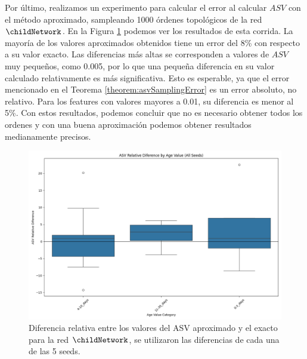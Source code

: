 Por último, realizamos un experimento para calcular el error al calcular $ASV$ con el método aproximado, sampleando 1000 órdenes topológicos de la red $\childNetwork$. En la Figura \ref{fig:boxplotASVApproximateDifferences} podemos ver los resultados de esta corrida. La mayoría de los valores aproximados obtenidos tiene un error del 8\% con respecto a su valor exacto. Las diferencias más altas se corresponden a valores de $ASV$ muy pequeños, como 0.005, por lo que una pequeña diferencia en su valor calculado relativamente es más significativa. Esto es esperable, ya que el error mencionado en el Teorema \ref{theorem:asvSamplingError} es un error absoluto, no relativo. Para los features con valores mayores a 0.01, su diferencia es menor al 5\%.
Con estos resultados, podemos concluir que no es necesario obtener todos los ordenes y con una buena aproximación podemos obtener resultados medianamente precisos. 


\begin{figure}
    \centering
    \includegraphics[width=0.8\linewidth]{img/asvResults/ChildAllSeedsASVBoxplot.png}
    \caption{Diferencia relativa entre los valores del ASV aproximado y el exacto para la red $\childNetwork$, se utilizaron las diferencias de cada una de las 5 seeds.}
    \label{fig:boxplotASVApproximateDifferences}
\end{figure}


